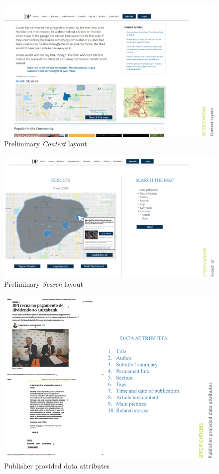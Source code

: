 \begin{figure}[H]
	\centering
	\includegraphics[width=.9\linewidth]{images/context_layout.png}
	\caption{Preliminary \textit{Context} layout}
	\label{fig:context_ui}
\end{figure}

\begin{figure}[H]
	\centering
	\includegraphics[width=.9\linewidth]{images/search_layout.png}
	\caption{Preliminary \textit{Search} layout}
	\label{fig:search_ui}
\end{figure}

\begin{figure}[H]
	\centering
	\includegraphics[width=.9\linewidth]{images/provided_attributes.png}
	\caption{Publisher provided data attributes}
	\label{fig:publisher_atts}
\end{figure}

